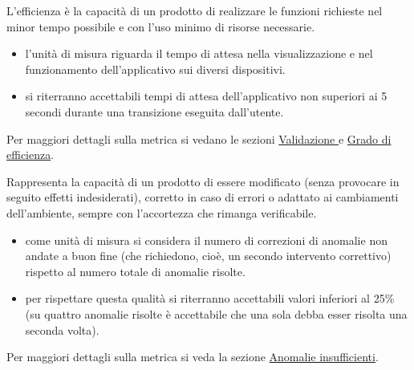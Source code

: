 \documentclass[a4paper, titlepage]{article}
\begin{document}
L'efficienza è la capacità di un prodotto  di realizzare le funzioni richieste nel minor tempo possibile e con l'uso minimo di risorse necessarie.
\begin{itemize}
\item {} l'unità di misura riguarda il tempo di attesa nella visualizzazione e nel funzionamento dell'applicativo sui diversi dispositivi.
\item {} si riterranno accettabili tempi di attesa dell'applicativo non superiori ai 5 secondi durante una transizione eseguita dall'utente.
\end{itemize}
Per maggiori dettagli sulla metrica si vedano le sezioni \hyperref[par:web]{Validazione } e \hyperref[par:greff]{Grado di efficienza}.

Rappresenta la capacità di un prodotto  di essere modificato (senza provocare in seguito effetti indesiderati), corretto in caso di errori o adattato ai cambiamenti dell'ambiente, sempre con l'accortezza che rimanga verificabile.
\begin{itemize}
\item {} come unità di misura si considera il numero di correzioni di anomalie non andate a buon fine (che richiedono, cioè, un secondo intervento correttivo) rispetto al numero totale di anomalie risolte.
\item {} per rispettare questa qualità si riterranno accettabili valori inferiori al 25\% (su quattro anomalie risolte è accettabile che una sola debba esser risolta una seconda volta).
\end{itemize}
Per maggiori dettagli sulla metrica si veda la sezione \hyperref[par:anins]{Anomalie insufficienti}.
\end{document}
